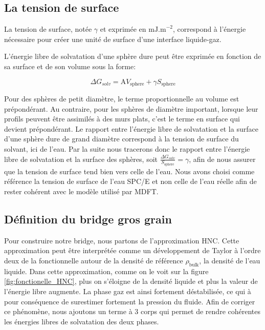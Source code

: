 \subsection{La tension de surface}
La tension de surface, notée $\gamma$ et exprimée en $\mathrm{mJ.m}^{-2}$, correspond à l'énergie nécessaire pour créer une unité de surface d'une interface liquide-gaz.

L'énergie libre de solvatation d'une sphère dure peut être exprimée en fonction de sa surface et de son volume sous la forme:

\begin{equation} \label{eq:energie_libre_terme_volume_surface}
\Delta G_{solv}= \mathrm{A} V_{\mathrm{sphere}} + \gamma S_{\mathrm{sphere}} 
\end{equation}

Pour des sphères de petit diamètre, le terme proportionnelle au volume est prépondérant. Au contraire, pour les sphères de diamètre important, lorsque leur profils peuvent être assimilés à des murs plats, c'est le terme en surface qui devient prépondérant. Le rapport entre l'énergie libre de solvatation et la surface d'une sphère dure de grand diamètre correspond à la tension de surface du solvant, ici de l'eau. Par la suite nous tracerons donc le rapport entre l'énergie libre de solvatation et la surface des sphères, soit $\frac{\Delta G_{solv}}{S_{\mathrm{sphere}}}=\gamma$, afin de nous assurer que la tension de surface tend bien vers celle de l'eau. Nous avons choisi comme référence la tension de surface de l'eau SPC/E et non celle de l'eau réelle afin de rester cohérent avec le modèle utilisé par MDFT.








\subsection{Définition du bridge gros grain}
Pour construire notre bridge, nous partons de l'approximation HNC. Cette approximation peut être interprétée comme un développement de Taylor à l'ordre deux de la fonctionnelle autour de la densité de référence $\rho_{\mathrm{bulk}}$, la densité de l'eau liquide.
Dans cette approximation, comme on le voit sur la figure \ref{fig:fonctionelle_HNC}, plus on s'éloigne de la densité liquide et plus la valeur de l'énergie libre augmente. La phase gaz est ainsi fortement déstabilisée, ce qui à pour conséquence de surestimer fortement la pression du fluide.
Afin de corriger ce phénomène, nous ajoutons un terme à 3 corps qui permet de rendre cohérentes les énergies libres de solvatation des deux phases.

